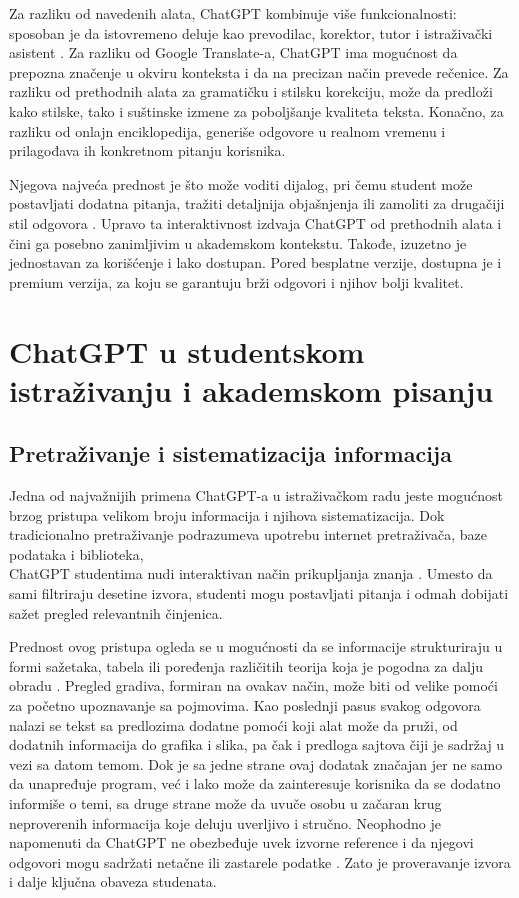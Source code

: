 \documentclass[12pt]{article}
\begin{document}
Za razliku od navedenih alata, ChatGPT kombinuje više funkcionalnosti: sposoban je da istovremeno deluje kao prevodilac, korektor, tutor i istraživački asistent \cite{petrovska2024chatgpt}. Za razliku od Google Translate-a, ChatGPT ima mogućnost da prepozna značenje u okviru konteksta i da na precizan način prevede rečenice. Za razliku od prethodnih alata za gramatičku i stilsku korekciju, može da predloži kako stilske, tako i suštinske izmene za poboljšanje kvaliteta teksta. Konačno, za razliku od onlajn enciklopedija, generiše odgovore u realnom vremenu i prilagođava ih konkretnom pitanju korisnika.

Njegova najveća prednost je što može voditi dijalog, pri čemu student može postavljati dodatna pitanja, tražiti detaljnija objašnjenja ili zamoliti za drugačiji stil odgovora \cite{petrovska2024chatgpt}. Upravo ta interaktivnost izdvaja ChatGPT od prethodnih alata i čini ga posebno zanimljivim u akademskom kontekstu. Takođe, izuzetno je jednostavan za korišćenje i lako dostupan. Pored besplatne verzije, dostupna je i premium verzija, za koju se garantuju brži odgovori i njihov bolji kvalitet.

 

\section{ChatGPT u studentskom istraživanju i akademskom pisanju}
\subsection{Pretraživanje i sistematizacija informacija}
Jedna od najvažnijih primena ChatGPT-a u istraživačkom radu jeste mogućnost brzog pristupa velikom broju informacija i njihova sistematizacija. Dok tradicionalno pretraživanje podrazumeva upotrebu internet pretraživača, baze podataka i biblioteka, 
\\ChatGPT studentima nudi interaktivan način prikupljanja znanja \cite{baig2024systematic}. Umesto da sami filtriraju desetine izvora, studenti mogu postavljati pitanja i odmah dobijati sažet pregled relevantnih činjenica.

Prednost ovog pristupa ogleda se u mogućnosti da se informacije strukturiraju u formi sažetaka, tabela ili poređenja različitih teorija koja je pogodna za dalju obradu \cite{shyr2024summarization}. Pregled gradiva, formiran na ovakav način, može biti od velike pomoći za početno upoznavanje sa pojmovima. Kao poslednji pasus svakog odgovora nalazi se tekst sa predlozima dodatne pomoći koji alat može da pruži, od dodatnih informacija do grafika i slika, pa čak i predloga sajtova čiji je sadržaj u vezi sa datom temom. Dok je sa jedne strane ovaj dodatak značajan jer ne samo da unapređuje program, već i lako može da zainteresuje korisnika da se dodatno informiše o temi, sa druge strane može da uvuče osobu u začaran krug neproverenih informacija koje deluju uverljivo i stručno. 
Neophodno je napomenuti da ChatGPT ne obezbeđuje uvek izvorne reference i da njegovi odgovori mogu sadržati netačne ili zastarele podatke \cite{mok2025genaisummariser}. Zato je proveravanje izvora i dalje ključna obaveza studenata. 
\end{document}
